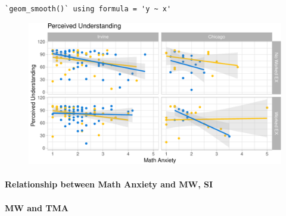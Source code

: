 \documentclass[
  letterpaper,
  DIV=11,
  numbers=noendperiod]{scrartcl}
\let\oldparagraph\paragraph
\renewcommand{\paragraph}[1]{\oldparagraph{#1}\mbox{}}
\begin{document}
\begin{verbatim}
`geom_smooth()` using formula = 'y ~ x'
\end{verbatim}

\begin{figure}[H]

{\centering \includegraphics{sampling_files/figure-pdf/unnamed-chunk-20-1.pdf}

}

\end{figure}

\hypertarget{relationship-between-math-anxiety-and-mw-si}{%
\paragraph{Relationship between Math Anxiety and MW,
SI}\label{relationship-between-math-anxiety-and-mw-si}}

\hypertarget{mw-and-tma}{%
\paragraph{MW and TMA}\label{mw-and-tma}}
\end{document}
